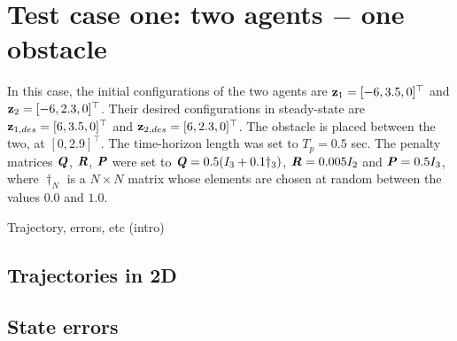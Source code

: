 \section{Test case one: two agents $-$ one obstacle}

In this case, the initial configurations of the two agents are
$\bm{\mathbf{z}}_1 = [-6, 3.5, 0]^{\top}$ and
$\bm{\mathbf{z}}_2 = [-6, 2.3, 0]^{\top}$.
Their desired configurations in steady-state are
$\bm{\mathbf{z}}_{1,des} = [6, 3.5, 0]^{\top}$ and
$\bm{\mathbf{z}}_{2,des} = [6, 2.3, 0]^{\top}$.
The obstacle is placed between the two, at $[0, 2.9]^{\top}$. The time-horizon
length was set to $T_p = 0.5$ sec. The penalty matrices $\bm{\mathit{Q}}$, $\bm{\mathit{R}}$,
$\bm{\mathit{P}}$ were set to $\bm{\mathit{Q}} = 0.5 (I_3 + 0.1 \dagger_3)$,
$\bm{\mathit{R}} = 0.005 I_2$ and $\bm{\mathit{P}} = 0.5 I_3$, where $\dagger_N$ is a
$N \times N$ matrix whose elements are chosen at random between the values $0.0$
and $1.0$.

Trajectory, errors, etc (intro)


\subsection{Trajectories in 2D}

\begin{figure}[H]
  
  \caption{}
  \label{}
\end{figure}


\subsection{State errors}

\noindent{}


